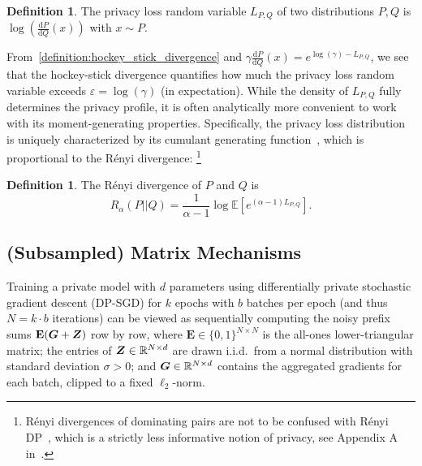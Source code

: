 \documentclass{article}
\theoremstyle{plain}
\theoremstyle{definition}
\newtheorem{definition}[theorem]{Definition}
\theoremstyle{remark}
\renewcommand{\epsilon}{\varepsilon}
\newcommand{\dd}{\mathrm{d}}
\begin{document}
\begin{definition}
    The privacy loss random variable $L_{P,Q}$ of two distributions $P,Q$ is $\log(\frac{\dd P}{\dd Q}(x))$ with $x \sim P$.
\end{definition}
From~\cref{definition:hockey_stick_divergence} and $\gamma \frac{\dd P}{\dd Q}(x) = e^{\log(\gamma) - L_{P,Q}}$, we see that the hockey-stick divergence quantifies  how much the privacy loss random variable exceeds $\epsilon=\log(\gamma)$ (in expectation).
While the density of $L_{P,Q}$ fully determines the privacy profile, it is often analytically more convenient to work with its moment-generating properties. Specifically, the privacy loss distribution 
is uniquely characterized by its cumulant generating function~\cite{zhu2022optimal}, which is proportional to the Rényi divergence:
\footnote{R\'enyi divergences of dominating pairs are not to be confused with R\'enyi DP~\cite{mironov2017renyi}, which is a strictly less informative notion of privacy, see Appendix A in~\cite{zhu2022optimal}.}
\begin{definition}
    The R\'enyi divergence of $P$ and $Q$ is
    \begin{equation}
        R_\alpha(P||Q) = \frac{1}{\alpha - 1} \log \mathbb{E}\left[  e^{ (\alpha - 1) L_{P,Q}} \right].
    \end{equation}
\end{definition}

\subsection{(Subsampled) Matrix Mechanisms}\label{section:background_matrix_mechanisms}

Training a private model with $d$ parameters using differentially private stochastic gradient descent (DP-SGD) for $k$ epochs with $b$ batches per epoch (and thus $N = k \cdot b$ iterations) can be viewed as sequentially computing the noisy prefix sums $\mathbf{E}({\bm{G}} + {\bm{Z}})$ row by row, where $\mathbf{E} \in \{0,1\}^{N \times N}$ is the all-ones lower-triangular matrix; the entries of ${\bm{Z}} \in {\mathbb{R}}^{N \times d}$ are drawn i.i.d.\ from a normal distribution with standard deviation $\sigma > 0$; and ${\bm{G}} \in {\mathbb{R}}^{N \times d}$ contains the aggregated gradients for each batch, clipped to a fixed $\ell_2$-norm.

\end{document}
